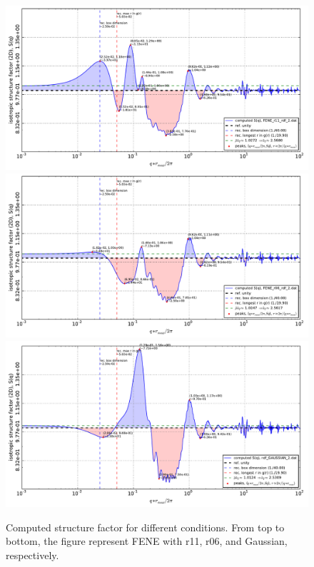 \documentclass[10pt, a4paper]{report}
\begin{document}
\begin{appendices}
    \begin{figure}
      \centering
      \includegraphics[height=0.3\textheight]{figures/Sq_FENE_r11_2.pdf}\\
      \includegraphics[height=0.3\textheight]{figures/Sq_FENE_r06_2.pdf}\\
      \includegraphics[height=0.3\textheight]{figures/Sq_GAUSSIAN_2.pdf}
      \caption{Computed structure factor for different conditions. From top to bottom, the figure represent FENE with r11, r06, and Gaussian, respectively.}
      \label{fig:2d_Sq_compare_all}
    \end{figure}



\end{appendices}
\end{document}
